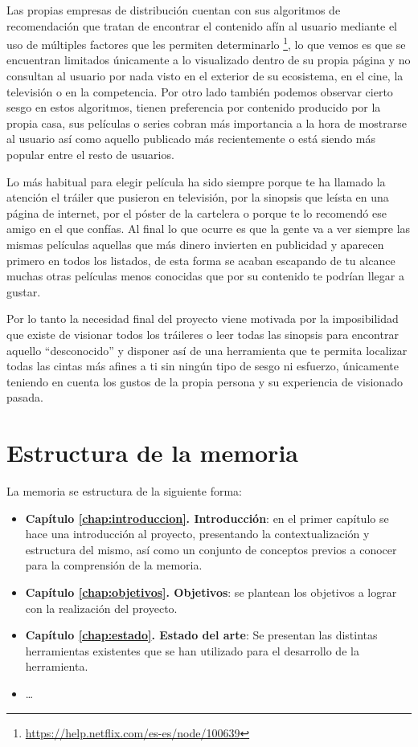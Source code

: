 \documentclass[a4paper, 12pt]{book}
\begin{document}
Las propias empresas de distribución cuentan con sus algoritmos de recomendación que tratan de encontrar el contenido afín al usuario mediante el uso de múltiples factores que les permiten determinarlo \footnote{\url{https://help.netflix.com/es-es/node/100639}}, lo que vemos es que se encuentran limitados únicamente a lo visualizado dentro de su propia página y no consultan al usuario por nada visto en el exterior de su ecosistema, en el cine, la televisión o en la competencia. Por otro lado también podemos observar cierto sesgo en estos algoritmos, tienen preferencia por contenido producido por la propia casa, sus películas o series cobran más importancia a la hora de mostrarse al usuario así como aquello publicado más recientemente o está siendo más popular entre el resto de usuarios.

Lo más habitual para elegir película ha sido siempre porque te ha llamado la atención el tráiler que pusieron en televisión, por la sinopsis que leísta en una página de internet, por el póster de la cartelera o porque te lo recomendó ese amigo en el que confías. Al final lo que ocurre es que la gente va a ver siempre las mismas películas aquellas que más dinero invierten en publicidad y aparecen primero en todos los listados, de esta forma se acaban escapando de tu alcance muchas otras películas menos conocidas que por su contenido te podrían llegar a gustar.

Por lo tanto la necesidad final del proyecto viene motivada por la imposibilidad que existe de visionar todos los tráileres o leer todas las sinopsis para encontrar aquello ``desconocido'' y disponer así de una herramienta que te permita localizar todas las cintas más afines a ti sin ningún tipo de sesgo ni esfuerzo, únicamente teniendo en cuenta los gustos de la propia persona y su experiencia de visionado pasada.

\section{Estructura de la memoria}
\label{sec:estructura}

La memoria se estructura de la siguiente forma:

\begin{itemize}
  \item \textbf{Capítulo \ref{chap:introduccion}. Introducción}: en el primer capítulo se hace una introducción al proyecto, presentando la contextualización y estructura del mismo, así como un conjunto de conceptos previos a conocer para la comprensión de la memoria.
  
  \item \textbf{Capítulo \ref{chap:objetivos}. Objetivos}: se plantean los objetivos a lograr con la realización del proyecto.
  
  \item \textbf{Capítulo \ref{chap:estado}. Estado del arte}: Se presentan las distintas herramientas existentes que se han utilizado para el desarrollo de la herramienta.
  
  \item \ldots
\end{itemize}
\end{document}
